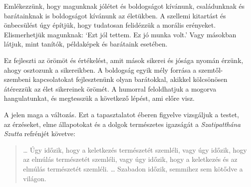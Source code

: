 Emlékezzünk, hogy magunknak jólétet és boldogságot kívánunk,
családunknak és barátainknak is boldogságot kívánunk az életükben. A
szellemi kitartást és önbecsülést úgy építjük, hogy tudatosan felidézzük
a morális erényeket. Elismerhetjük magunknak: `Ezt jól tettem. Ez jó
munka volt.' Vagy másokban látjuk, mint tanítók, példaképek és barátaink
esetében.

Ez fejleszti az örömöt és értékelést, amit mások sikerei és jósága
nyomán érzünk, ahogy osztozunk a sikereikben. A boldogság egyik mély
forrása a szemtől-szembeni kapcsolatokat fejlesztenünk olyan barátokkal,
akikkel kölcsönösen átérezzük az élet sikereinek örömét. A humorral
feloldhatjuk a mogorva hangulatunkat, és megtesszük a következő lépést,
ami előre visz.

A jelen maga a változás. Ezt a tapasztalatot éberen figyelve vizsgáljuk
a testet, az érzéseket, elme állapotokat és a dolgok természetes
igazságát a \emph{Szatipatthána Szutta} refrénjét követve:

\begin{quote}
\ldots{} Úgy időzik, hogy a keletkezés természetét szemléli, vagy úgy
időzik, hogy az elmúlás természetét szemléli, vagy úgy időzik, hogy a
keletkezés és az elmúlás természetét szemléli. \ldots{} Szabadon időzik,
semmihez sem kötődve a világon.

\bigskip

\end{quote}
